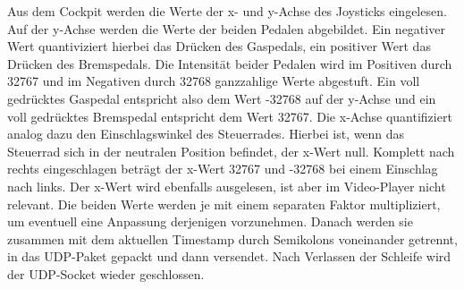 Aus dem Cockpit werden die Werte der x- und y-Achse des Joysticks eingelesen. Auf der y-Achse werden die Werte der beiden Pedalen abgebildet. Ein negativer Wert quantiviziert hierbei das Drücken des Gaspedals, ein positiver Wert das Drücken des Bremspedals. Die Intensität beider Pedalen wird im Positiven durch 32767 und im Negativen durch 32768 ganzzahlige Werte abgestuft. Ein voll gedrücktes Gaspedal entspricht also dem Wert -32768 auf der y-Achse und ein voll gedrücktes Bremspedal entspricht dem Wert 32767. Die x-Achse quantifiziert analog dazu den Einschlagswinkel des Steuerrades. Hierbei ist, wenn das Steuerrad sich in der neutralen Position befindet, der x-Wert null. Komplett nach rechts eingeschlagen beträgt der x-Wert 32767 und -32768 bei einem Einschlag nach links. Der x-Wert wird ebenfalls ausgelesen, ist aber im Video-Player nicht relevant. Die beiden Werte werden je mit einem separaten Faktor multipliziert, um eventuell eine Anpassung derjenigen vorzunehmen. Danach werden sie zusammen mit dem aktuellen Timestamp durch Semikolons voneinander getrennt, in das UDP-Paket gepackt und dann versendet. Nach Verlassen der Schleife wird der UDP-Socket wieder geschlossen.

